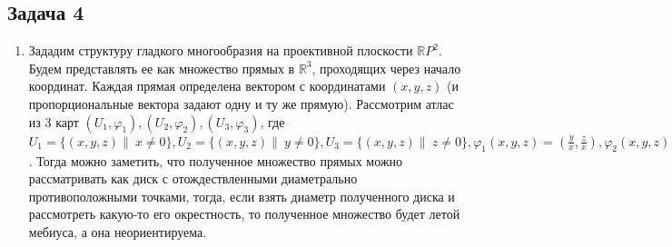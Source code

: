 \subsection*{Задача 4}
\begin{enumerate}
\item[(а)]
	Зададим структуру гладкого многообразия на проективной плоскости $\mathbb{R}P^2$. Будем представлять ее как множество прямых в $\mathbb{R}^3$, проходящих через начало координат. Каждая прямая определена вектором с координатами $(x,y,z)$ (и пропорциональные вектора задают одну и ту же прямую). Рассмотрим атлас из 3 карт $(U_1, \varphi_1), (U_2, \varphi_2), (U_3, \varphi_3)$, где $U_1 = \{(x,y,z)\|\ x \ne 0\}, U_2 = \{(x,y,z)\|\ y \ne 0\}, U_3 = \{(x,y,z)\|\ z \ne 0\}, \varphi_1(x,y,z) = (\frac{y}{x}, \frac{z}{x}), \varphi_2(x,y,z) = (\frac{x}{y}, \frac{z}{y}), \varphi_3(x,y,z) = (\frac{x}{z}, \frac{y}{z})$. Тогда можно заметить, что полученное множество прямых можно рассматривать как диск с отождествленными диаметрально противоположными точками, тогда, если взять диаметр полученного диска и рассмотреть какую-то его окрестность, то полученное множество будет летой мебиуса, а она неориентируема.
	

\end{enumerate}
